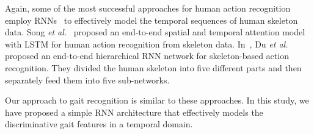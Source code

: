 Again, some of the most successful approaches for human action recognition employ RNNs~\cite{Song_17, Du_15} to effectively model the temporal sequences of human skeleton data. Song \textit{et al.}~\cite{Song_17} proposed an end-to-end spatial and temporal attention model with LSTM for human action recognition from skeleton data. In~\cite{Du_15}, Du \textit{et al.} proposed an end-to-end hierarchical RNN network for skeleton-based action recognition. They divided the human skeleton into five different parts and then separately feed them into five sub-networks. 

Our approach to gait recognition is similar to these approaches. In this study, we have proposed a simple RNN architecture that effectively models the discriminative gait features in a temporal domain. 


